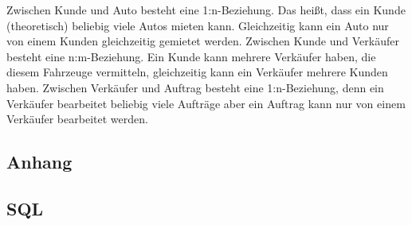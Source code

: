 \documentclass[a4paper,12pt]{article}
\begin{document}
Zwischen Kunde und Auto besteht eine 1:n-Beziehung. Das heißt, dass ein Kunde (theoretisch) beliebig viele Autos mieten kann. Gleichzeitig kann ein Auto nur von einem Kunden gleichzeitig gemietet werden.
Zwischen Kunde und Verkäufer besteht eine n:m-Beziehung. Ein Kunde kann mehrere Verkäufer haben, die diesem Fahrzeuge vermitteln, gleichzeitig kann ein Verkäufer mehrere Kunden haben.
Zwischen Verkäufer und Auftrag besteht eine 1:n-Beziehung, denn ein Verkäufer bearbeitet beliebig viele Aufträge aber ein Auftrag kann nur von einem Verkäufer bearbeitet werden.

\newpage
\begin{appendix}
\section{Anhang}

\subsection{SQL}



\end{appendix}
\end{document}
